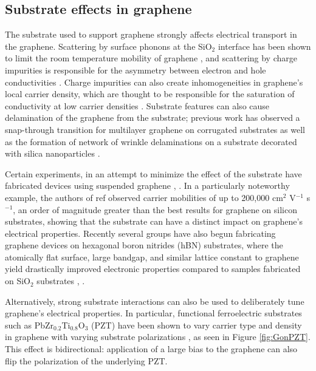 \documentclass[edeposit,fullpage,draftthesis]{uiucthesis2009}
\begin{document}
        \subsection{Substrate effects in graphene}
        The substrate used to support graphene strongly affects electrical transport in the graphene. Scattering by surface phonons at the SiO$_2$ interface has been shown to limit the room temperature mobility of graphene \cite{Chen2008}, and scattering by charge impurities is responsible for the asymmetry between electron and hole conductivities \cite{Hwang2007}. Charge impurities can also create inhomogeneities in graphene's local carrier density, which are thought to be responsible for the saturation of conductivity at low carrier densities \cite{Hwang2007}. Substrate features can also cause delamination of the graphene from the substrate; previous work has observed a snap-through transition for multilayer graphene on corrugated substrates \cite{Scharfenberg2012} as well as the formation of network of wrinkle delaminations on a substrate decorated with silica nanoparticles \cite{Yamamoto2012}.
    
        Certain experiments, in an attempt to minimize the effect of the substrate have fabricated devices using suspended graphene \cite{Bolotin2008}, \cite{Du2008}. In a particularly noteworthy example, the authors of ref \cite{Bolotin2008} observed carrier mobilities of up to 200,000 cm$^2$ V$^{-1}$ s$^{-1}$, an order of magnitude greater than the best results for graphene on silicon substrates, showing that the substrate can have a distinct impact on graphene's electrical properties. Recently several groups have also begun fabricating graphene devices on hexagonal boron nitrides (hBN) substrates, where the atomically flat surface, large bandgap, and similar lattice constant to graphene yield drastically improved electronic properties compared to samples fabricated on SiO$_2$ substrates \cite {Dean2010}, \cite{Xue2011}.
    
        Alternatively, strong substrate interactions can also be used to deliberately tune graphene's electrical properties. In particular, functional ferroelectric substrates such as PbZr$_{0.2}$Ti$_{0.8}$O$_3$ (PZT) have been shown to vary carrier type and density in graphene with varying substrate polarizations \cite{Baeumer2013}, as seen in Figure \ref{fig:GonPZT}. This effect is bidirectional: application of a large bias to the graphene can also flip the polarization of the underlying PZT.
    
\end{document}
